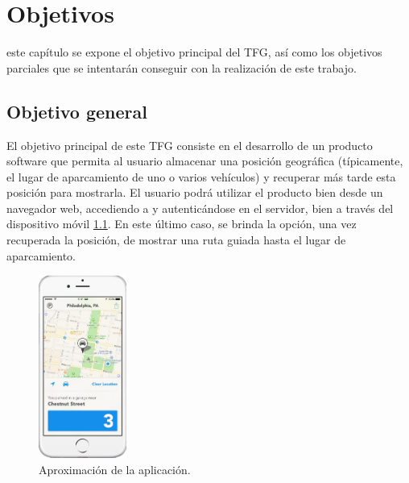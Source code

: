 \chapter{Objetivos}
\label{chap:objetivos}

\noindent
%

 este capítulo se expone el objetivo principal del \ac{TFG}, así como los objetivos parciales que se intentarán conseguir con la realización de este trabajo.

\section{Objetivo general}

El objetivo principal de este \ac{TFG} consiste en el desarrollo de un producto software que permita al usuario almacenar una posición geográfica (típicamente, el lugar de aparcamiento de uno o varios vehículos) y recuperar más tarde esta posición para mostrarla. El usuario podrá utilizar el producto bien desde un navegador web, accediendo a y autenticándose en el servidor, bien a través del dispositivo móvil \ref{fig:Preview_App}. En este último caso, se brinda la opción, una vez recuperada la posición, de mostrar una ruta guiada hasta el lugar de aparcamiento.

\begin{figure}[hbtp]
\centering
\includegraphics[height=60mm, fbox={\fboxrule} 4mm]{images/objetivos/telefono_parking.jpg}
\caption{Aproximación de la aplicación.}
\label{fig:Preview_App}
\end{figure}


